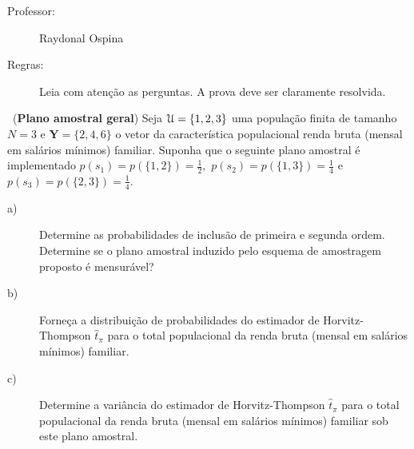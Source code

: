 \documentclass[a4paper,12pt,oneside,twocolumn]{Config/milktest}
\begin{document}
\beb
{\small
\begin{description}
\item[Professor:] Raydonal Ospina

\item[Regras:] Leia com atenção as perguntas. A prova deve ser claramente resolvida. 

\end{description}
}
\eeb

\balance



\medskip 
\question~({\bf Plano amostral geral})    Seja 
${\cal U}=\{1,2,3\}$ uma população finita de tamanho $N=3$ e $\mathbf{Y} =\{2,4,6\}$  o vetor da característica populacional renda bruta (mensal em salários mínimos) familiar.  Suponha que o seguinte plano amostral é implementado 
$p(s_1)=p(\{1,2\})=\frac{1}{2},$ $p(s_2)=p(\{1,3\})=\frac{1}{4}$ e
$p(s_3)=p(\{2,3\})=\frac{1}{4}.$
\begin{description}
\item[a)] Determine as probabilidades de inclusão de primeira e  segunda ordem. Determine se o plano amostral induzido pelo esquema de amostragem proposto é mensurável? 
\item[b)] Forneça a distribuição de probabilidades do estimador de Horvitz-Thompson $\hat{t}_\pi$ para o total populacional da renda bruta (mensal em salários mínimos) familiar.
\item[c)] Determine a variância do estimador de Horvitz-Thompson $\hat{t}_\pi$ para o total populacional da renda bruta (mensal em salários mínimos) familiar sob este plano amostral.
\end{description}
\end{document}
